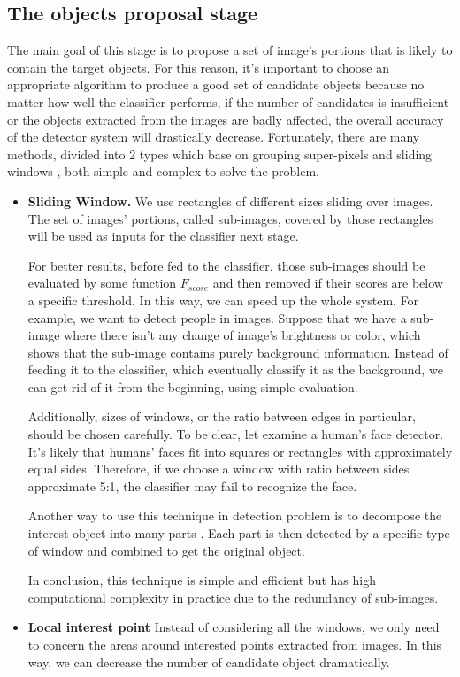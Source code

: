 \documentclass[conference]{IEEEtran}
\begin{document}
\subsection{The objects proposal stage}
The main goal of this stage is to propose a set of image's portions that is likely to contain the target objects. For this reason, it's important to choose an appropriate algorithm to produce a good set of candidate objects because no matter how well the classifier performs, if the number of candidates is insufficient or the objects extracted from the images are badly affected, the overall accuracy of the detector system will drastically decrease. Fortunately, there are many methods, divided into 2 types which base on grouping super-pixels and sliding windows \cite{slidingwin5}, both simple and complex to solve the problem.
\begin{itemize}
	\item \textbf{Sliding Window.} \cite{slidingwin1}\cite{slidingwin2} We use rectangles of different sizes sliding over images. The set of images' portions, called sub-images, covered by those rectangles will be used as inputs for the classifier next stage. 
	
	For better results, before fed to the classifier, those sub-images should be evaluated by some function $F_{score}$ and then removed if their scores are below a specific threshold. In this way, we can speed up the whole system. For example, we want to detect people in images. Suppose that we have a sub-image where there isn't any change of image's brightness or color, which shows that the sub-image contains purely background information. Instead of feeding it to the classifier, which eventually classify it as the background, we can get rid of it from the beginning, using simple evaluation. 
	
	Additionally, sizes of windows, or the ratio between edges in particular, should be chosen carefully. To be clear, let examine a human's face detector. It's likely that humans' faces fit into squares or rectangles with approximately equal sides. Therefore, if we choose a window with ratio between sides approximate 5:1, the classifier may fail to recognize the face.
	
	Another way to use this technique in detection problem is to decompose the interest object into many parts \cite{slidingwin4}. Each part is then detected by a specific type of window and combined to get the original object.
	
	In conclusion, this technique is simple and efficient but has high computational complexity in practice due to the redundancy of sub-images.  
	\item \textbf{Local interest point} \cite{localinterestpoint1} Instead of considering all the windows, we only need to concern the areas around interested points extracted from images. In this way, we can decrease the number of candidate object dramatically.
\end{itemize} 

\end{document}
